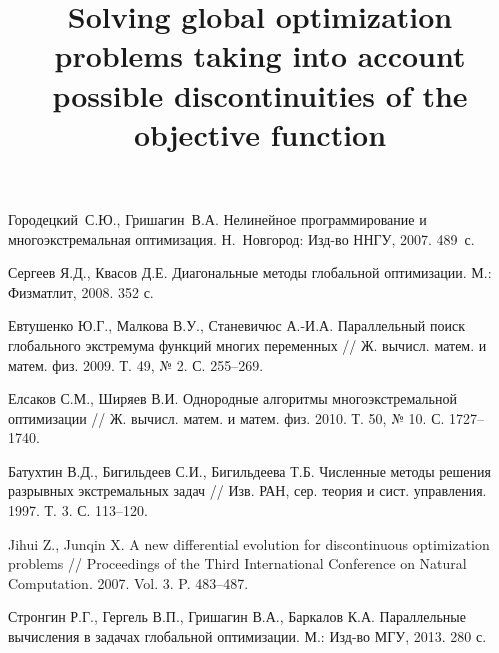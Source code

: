 \documentclass[11pt, oneside, a4paper]{article}
\begin{document}
\begin{biblio}







Городецкий~С.Ю., Гришагин~В.А. Нелинейное программирование и многоэкстремальная оптимизация. Н.~Новгород: Изд-во ННГУ, 2007. 489~с.

Сергеев Я.Д., Квасов Д.Е. Диагональные методы глобальной оптимизации. М.: Физматлит, 2008. 352 с. 

Евтушенко Ю.Г., Малкова В.У., Станевичюс А.-И.А. Параллельный поиск глобального экстремума функций многих переменных // Ж. вычисл. матем. и матем. физ. 2009. Т. 49, № 2.  С. 255--269.

Елсаков С.М., Ширяев В.И. Однородные алгоритмы многоэкстремальной оптимизации // Ж. вычисл. матем. и матем. физ. 2010. Т. 50, № 10. С. 1727--1740.

Батухтин В.Д., Бигильдеев С.И., Бигильдеева Т.Б. Численные методы решения разрывных экстремальных задач // Изв. РАН, сер. теория и сист. управления. 1997. Т. 3. С. 113--120.

Jihui Z., Junqin X. A new differential evolution for discontinuous optimization problems // 
Proceedings of the Third International Conference on Natural Computation. 2007. Vol. 3. P. 483--487.

Стронгин Р.Г., Гергель В.П., Гришагин В.А., Баркалов К.А. Параллельные вычисления в задачах глобальной оптимизации. М.: Изд-во МГУ, 2013. 280 с.




\end{biblio}


\title{Solving global optimization problems taking into account possible discontinuities of the objective function}

\end{document}
